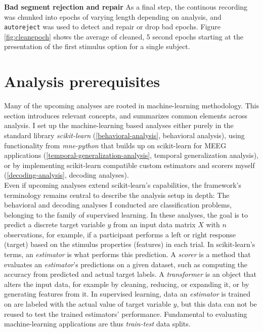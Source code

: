 \textbf{Bad segment rejection and repair} As a final step, the continous recording was chunked into epochs of varying length depending on analysis, and \texttt{autoreject} was used to detect and repair or drop bad epochs.
Figure \ref{fig:cleanepoch} shows the average of cleaned, 5 second epochs starting at the presentation of the first stimulus option for a single subject.



\section{Analysis prerequisites}
\label{decoding}

Many of the upcoming analyses are rooted in machine-learning methodology.
This section introduces relevant concepts, and summarizes common elements across analysis.
I set up the machine-learning based analyses either purely in the standard library \textit{scikit-learn} (\ref{behavioral-analysis}, behavioral analysis), using functionality from \textit{mne-python} that builds up on scikit-learn for MEEG applications (\ref{temporal-generalization-analysis}, temporal generalization analysis), or by implementing scikit-learn compatible custom estimators and scorers myself (\ref{decoding-analysis}, decoding analyses).\\
Even if upcoming analyses extend scikit-learn's capabilities, the framework's terminology remains central to describe the analysis setup in depth:
The behavioral and decoding analyses I conducted are classification problems, belonging to the family of supervised learning.
In these analyses, the goal is to predict a discrete target variable $y$ from an input data matrix $X$ with $n$ observations, for example, if a participant performs a left or right response (target) based on the stimulus properties (features) in each trial.
In scikit-learn's terms, an \textit{estimator} is what performs this prediction.
A \textit{scorer} is a method that evaluates an \textit{estimator}'s predictions on a given dataset, such as computing the accuracy from predicted and actual target labels.
A \textit{transformer} is an object that alters the input data, for example by cleaning, reducing, or expanding it, or by generating features from it.
In supervised learning, data an \textit{estimator} is trained on are labeled with the actual value of target variable $y$, but this data can not be reused to test the trained estimators' performance.
Fundamental to evaluating machine-learning applications are thus \textit{train-test} data splits.
